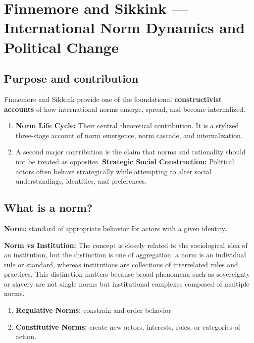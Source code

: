 \clearpage
\section{Finnemore and Sikkink --- International Norm Dynamics and Political Change}

\subsection{Purpose and contribution}

Finnemore and Sikkink provide one of the foundational \textbf{constructivist accounts} of how international norms emerge, spread, and become internalized.

\begin{enumerate}
    \item \textbf{Norm Life Cycle:} Their central theoretical contribution. It is a stylized three-stage account of norm emergence, norm cascade, and internalization.

    \item A second major contribution is the claim that norms and rationality should not be treated as opposites. \textbf{Strategic Social Construction:} Political actors often behave strategically while attempting to alter social understandings, identities, and preferences.
\end{enumerate}

\subsection{What is a norm?}

\textbf{Norm:} standard of appropriate behavior for actors with a given identity.

\textbf{Norm vs Institution:} The concept is closely related to the sociological idea of an institution, but the distinction is one of aggregation: a norm is an individual rule or standard, whereas institutions are collections of interrelated rules and practices. This distinction matters because broad phenomena such as sovereignty or slavery are not single norms but institutional complexes composed of multiple norms.

\begin{enumerate}
    \item \textbf{Regulative Norms:} constrain and order behavior
    \item \textbf{Constitutive Norms:} create new actors, interests, roles, or categories of action.
\end{enumerate}

